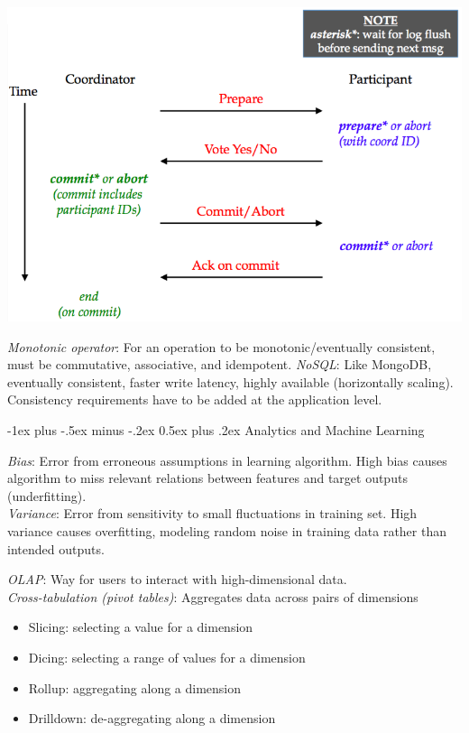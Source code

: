 \documentclass[10pt,landscape]{article}
\makeatletter
\renewcommand{\section}{\@startsection{section}{1}{0mm}%
                                {-1ex plus -.5ex minus -.2ex}%
                                {0.5ex plus .2ex}%
                                {\normalfont\large\bfseries}}
\makeatother
\begin{document}
\begin{multicols}{3}
\centerline{\includegraphics[width=.9\linewidth]{2pc.png}}

\textit{Monotonic operator}: For an operation to be monotonic/eventually consistent, must be commutative, associative, and idempotent.
\textit{NoSQL}: Like MongoDB, eventually consistent, faster write latency, highly available (horizontally scaling). Consistency requirements have to be added at the application level.


\section{Analytics and Machine Learning}

\textit{Bias}: Error from erroneous assumptions in learning algorithm. High bias causes algorithm to miss relevant relations between features and target outputs (underfitting). \\
\textit{Variance}: Error from sensitivity to small fluctuations in training set. High variance causes overfitting, modeling random noise in training data rather than intended outputs.

\textit{OLAP}: Way for users to interact with high-dimensional data. \\
\textit{Cross-tabulation (pivot tables)}: Aggregates data across pairs of dimensions

\begin{itemize}
  \item Slicing: selecting a value for a dimension
  \item Dicing: selecting a range of values for a dimension
  \item Rollup: aggregating along a dimension
  \item Drilldown: de-aggregating along a dimension
\end{itemize}


\end{multicols}
\end{document}
